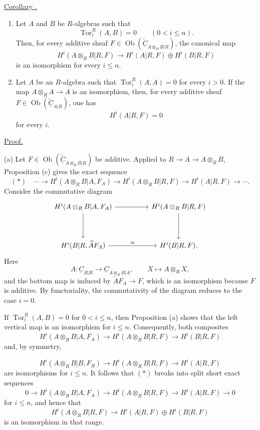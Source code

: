 
\underline{Corollary .}

\begin{enumerate}[label=(\alph*)]
\item Let $A$ and $B$ be $R$-algebras such that
\[
 \operatorname{Tor}_i^R(A,B)=0\qquad(0<i\leq n).
\]
Then, for every additive sheaf
$F\in\operatorname{Ob}(\widetilde{\underline C}_{A\otimes_RB|R})$,
the canonical map
\[
 H^i(A\otimes_RB|R,F)
 \longrightarrow H^i(A|R,F)\oplus H^i(B|R,F)
\]
is an isomorphism for every $i\leq n$.

\item Let $A$ be an $R$-algebra such that
$\operatorname{Tor}_i^R(A,A)=0$ for every $i>0$. If the map
$A\otimes_RA\longrightarrow A$ is an isomorphism, then, for every
additive sheaf
$F\in\operatorname{Ob}(\widetilde{\underline C}_{A|R})$, one has
\[
 H^i(A|R,F)=0
\]
for every $i$.
\end{enumerate}

\underline{Proof.}

(a) Let
$F\in\operatorname{Ob}(\widetilde{\underline C}_{A\otimes_RB|R})$
be additive. Applied to
$R\longrightarrow A\longrightarrow A\otimes_RB$, Proposition
(c) gives the exact sequence
\[
 (*)\quad\cdots\longrightarrow
 H^i(A\otimes_RB|A,F_A)
 \longrightarrow H^i(A\otimes_RB|R,F)
 \longrightarrow H^i(A|R,F)\longrightarrow\cdots.
\]
Consider the commutative diagram
\[
\begin{tikzcd}[column sep=huge,row sep=huge]
H^i(A\otimes_RB|A,F_A) \arrow[r] \arrow[d]
& H^i(A\otimes_RB|R,F) \arrow[d]\\
H^i(B|R,\widetilde A F_A) \arrow[r,"\approx"]
& H^i(B|R,F).
\end{tikzcd}
\]
Here
\[
 A:\underline C_{B|R}\longrightarrow
 \underline C_{A\otimes_RB|A},
 \qquad X\longmapsto A\otimes_RX,
\]
and the bottom map is induced by
$\widetilde A F_A\longrightarrow F$, which is an isomorphism
because $F$ is additive. By functoriality, the commutativity of the
diagram reduces to the case $i=0$.

If $\operatorname{Tor}_i^R(A,B)=0$ for $0<i\leq n$, then
Proposition (a) shows that the left vertical map is an
isomorphism for $i\leq n$. Consequently, both composites
\[
 H^i(A\otimes_RB|A,F_A)
 \longrightarrow H^i(A\otimes_RB|R,F)
 \longrightarrow H^i(B|R,F)
\]
and, by symmetry,


\[
 H^i(A\otimes_RB|B,F_B)
 \longrightarrow H^i(A\otimes_RB|R,F)
 \longrightarrow H^i(A|R,F)
\]
are isomorphisms for $i\leq n$. It follows that $(*)$ breaks into
split short exact sequences
\[
 0\longrightarrow H^i(A\otimes_RB|A,F_A)
 \longrightarrow H^i(A\otimes_RB|R,F)
 \longrightarrow H^i(A|R,F)\longrightarrow0
\]
for $i\leq n$, and hence that
\[
 H^i(A\otimes_RB|R,F)
 \longrightarrow H^i(A|R,F)\oplus H^i(B|R,F)
\]
is an isomorphism in that range.

